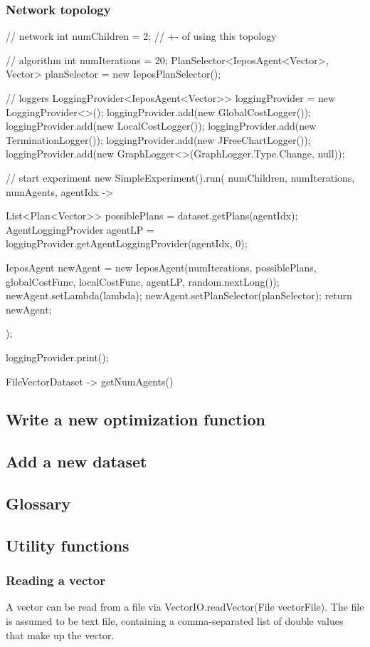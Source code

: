 \documentclass[11pt]{article} %
\newcommand{\code}{}
\begin{document}
\subsubsection*{Network topology}


        // network
        int numChildren = 2; // +- of using this topology

        // algorithm
        int numIterations = 20;
        PlanSelector<IeposAgent<Vector>, Vector> planSelector = new IeposPlanSelector();

        // loggers
        LoggingProvider<IeposAgent<Vector>> loggingProvider = new LoggingProvider<>();
        loggingProvider.add(new GlobalCostLogger());
        loggingProvider.add(new LocalCostLogger());
        loggingProvider.add(new TerminationLogger());
        loggingProvider.add(new JFreeChartLogger());
        loggingProvider.add(new GraphLogger<>(GraphLogger.Type.Change, null));

        // start experiment
        new SimpleExperiment().run(
                numChildren,
                numIterations,
                numAgents,
                agentIdx -> {
            List<Plan<Vector>> possiblePlans = dataset.getPlans(agentIdx);
            AgentLoggingProvider agentLP = loggingProvider.getAgentLoggingProvider(agentIdx, 0);

            IeposAgent newAgent = new IeposAgent(numIterations, possiblePlans, globalCostFunc, localCostFunc, agentLP, random.nextLong());
            newAgent.setLambda(lambda);
            newAgent.setPlanSelector(planSelector);
            return newAgent;
        });

        loggingProvider.print();


FileVectorDataset -> getNumAgents()

\subsection{Write a new optimization function} \label{sec:new_func}
\subsection{Add a new dataset} \label{sec:new_dataset}

\appendix{}
\subsection{Glossary}
\subsection{Utility functions}
\subsubsection{Reading a vector} \label{sec:read_vec}
A vector can be read from a file via \code{VectorIO.readVector(File vectorFile)}. The file is assumed to be text file, containing a comma-separated list of double values that make up the vector.
\end{document}
